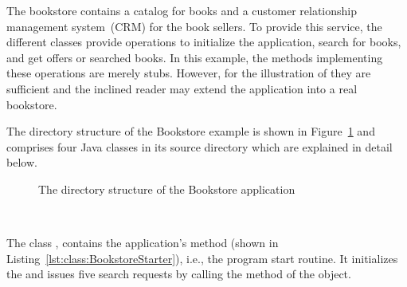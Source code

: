 \pagebreak

The bookstore contains a catalog for books and a customer relationship management system~(CRM) for the book sellers. To provide this service, the different classes provide operations to initialize the application, search for books, and get offers or searched books. In this example, the methods implementing these operations are merely stubs. However, for the illustration of \Kieker{} they are sufficient and the inclined reader may extend the application into a real bookstore.

The directory structure of the Bookstore example is shown in Figure~\ref{fig:PlainBookstoreExample} and comprises four Java classes in its source directory  which are explained in detail below.

\begin{figure}[H]
\begin{graybox}
\end{graybox}

\caption{The directory structure of the Bookstore application}
\label{fig:PlainBookstoreExample}
\end{figure}


\quad\

\enlargethispage{1cm}

\noindent The class , contains the application's  method (shown in Listing~\ref{lst:class:BookstoreStarter}), i.e., the program start routine. It initializes the  and issues five search requests by calling the  method of the  object.

\medskip

\setJavaCodeListing


